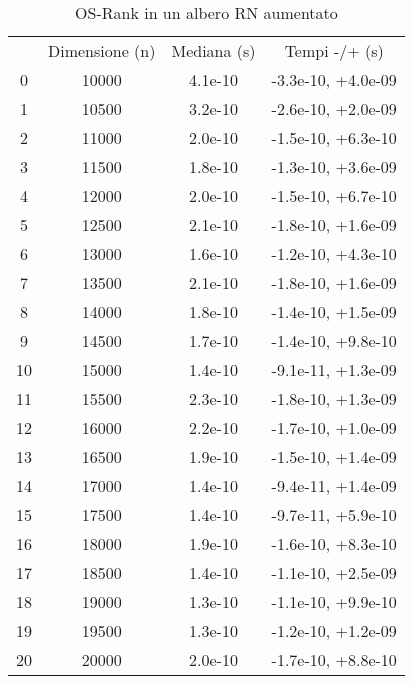 \begin{table}
\centering
\caption{OS-Rank in un albero RN aumentato}
\label{OS-Rank in un albero RN aumentato}
\begin{adjustbox}{width=1\textwidth/2}
\begin{tabular}{|c|c|c|c|}
\hline
 & Dimensione (n) & Mediana (s) & Tempi -/+ (s) \\
0 & 10000 & 4.1e-10 & -3.3e-10, +4.0e-09 \\
\cline{1-4}
1 & 10500 & 3.2e-10 & -2.6e-10, +2.0e-09 \\
\cline{1-4}
2 & 11000 & 2.0e-10 & -1.5e-10, +6.3e-10 \\
\cline{1-4}
3 & 11500 & 1.8e-10 & -1.3e-10, +3.6e-09 \\
\cline{1-4}
4 & 12000 & 2.0e-10 & -1.5e-10, +6.7e-10 \\
\cline{1-4}
5 & 12500 & 2.1e-10 & -1.8e-10, +1.6e-09 \\
\cline{1-4}
6 & 13000 & 1.6e-10 & -1.2e-10, +4.3e-10 \\
\cline{1-4}
7 & 13500 & 2.1e-10 & -1.8e-10, +1.6e-09 \\
\cline{1-4}
8 & 14000 & 1.8e-10 & -1.4e-10, +1.5e-09 \\
\cline{1-4}
9 & 14500 & 1.7e-10 & -1.4e-10, +9.8e-10 \\
\cline{1-4}
10 & 15000 & 1.4e-10 & -9.1e-11, +1.3e-09 \\
\cline{1-4}
11 & 15500 & 2.3e-10 & -1.8e-10, +1.3e-09 \\
\cline{1-4}
12 & 16000 & 2.2e-10 & -1.7e-10, +1.0e-09 \\
\cline{1-4}
13 & 16500 & 1.9e-10 & -1.5e-10, +1.4e-09 \\
\cline{1-4}
14 & 17000 & 1.4e-10 & -9.4e-11, +1.4e-09 \\
\cline{1-4}
15 & 17500 & 1.4e-10 & -9.7e-11, +5.9e-10 \\
\cline{1-4}
16 & 18000 & 1.9e-10 & -1.6e-10, +8.3e-10 \\
\cline{1-4}
17 & 18500 & 1.4e-10 & -1.1e-10, +2.5e-09 \\
\cline{1-4}
18 & 19000 & 1.3e-10 & -1.1e-10, +9.9e-10 \\
\cline{1-4}
19 & 19500 & 1.3e-10 & -1.2e-10, +1.2e-09 \\
\cline{1-4}
20 & 20000 & 2.0e-10 & -1.7e-10, +8.8e-10 \\
\cline{1-4}
\end{tabular}
\end{adjustbox}
\end{table}
